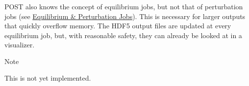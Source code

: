 P\+O\+ST also knows the concept of equilibrium jobs, but not that of perturbation jobs (see \hyperlink{page_overview_overview_jobs}{Equilibrium \& Perturbation Jobs}). This is necessary for larger outputs that quickly overflow memory. The H\+D\+F5 output files are updated at every equilibrium job, but, with reasonable safety, they can already be looked at in a visualizer.

\begin{DoxyNote}{Note}

\begin{DoxyEnumerate}
\item \label{page_overview_fng1}%
%
This is not yet implemented. 
\end{DoxyEnumerate}
\end{DoxyNote}
